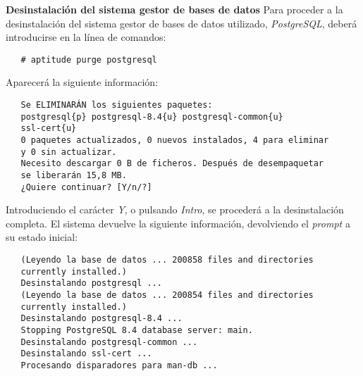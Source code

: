 \item \textbf{Desinstalación del sistema gestor de bases de datos}
   Para proceder a la desinstalación del sistema gestor de bases de datos
   utilizado, \textit{PostgreSQL}, deberá introducirse en la línea de comandos:

   \begin{verbatim}
   # aptitude purge postgresql
   \end{verbatim}

   Aparecerá la siguiente información:

   \begin{verbatim}
   Se ELIMINARÁN los siguientes paquetes:
   postgresql{p} postgresql-8.4{u} postgresql-common{u}
   ssl-cert{u}
   0 paquetes actualizados, 0 nuevos instalados, 4 para eliminar
   y 0 sin actualizar.
   Necesito descargar 0 B de ficheros. Después de desempaquetar
   se liberarán 15,8 MB.
   ¿Quiere continuar? [Y/n/?]
   \end{verbatim}

   Introduciendo el carácter \textit{Y}, o pulsando \textit{Intro}, se procederá
   a la desinstalación completa. El sistema devuelve la siguiente información,
   devolviendo el \textit{prompt} a su estado inicial:

   \begin{verbatim}
   (Leyendo la base de datos ... 200858 files and directories
   currently installed.)
   Desinstalando postgresql ...
   (Leyendo la base de datos ... 200854 files and directories
   currently installed.)
   Desinstalando postgresql-8.4 ...
   Stopping PostgreSQL 8.4 database server: main.
   Desinstalando postgresql-common ...
   Desinstalando ssl-cert ...
   Procesando disparadores para man-db ...
   \end{verbatim}
